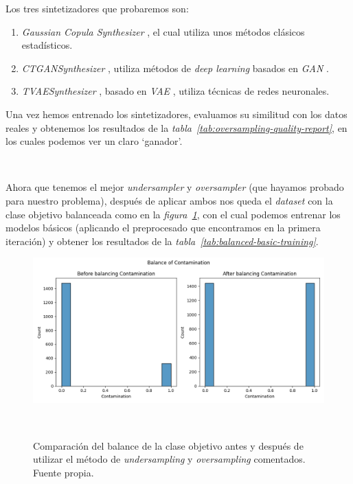 Los tres sintetizadores que probaremos son:

\begin{enumerate}
    \item \textit{Gaussian Copula Synthesizer} \cite{Gaussian4:online}, el cual utiliza unos métodos clásicos estadísticos.
    \item \textit{CTGANSynthesizer} \cite{CTGANSyn50:online}, utiliza métodos de \textit{deep learning} basados en \textit{GAN} \cite{Generati72:online}.
    \item \textit{TVAESynthesizer} \cite{TVAESynt0:online}, basado en \textit{VAE} \cite{Variatio61:online}, utiliza técnicas de redes neuronales.
\end{enumerate}

Una vez hemos entrenado los sintetizadores, evaluamos su similitud con los datos reales y obtenemos los resultados de la \textit{tabla\ \ref{tab:oversampling-quality-report}}, en los cuales podemos ver un claro `ganador'.

\begin{table}[!ht]
    \centering
    \caption{Resultados del \textit{quality report} de los datos generados con los sintetizadores. Fuente propia}\ \label{tab:oversampling-quality-report}
\end{table}

Ahora que tenemos el mejor \textit{undersampler} y \textit{oversampler} (que hayamos probado para nuestro problema), después de aplicar ambos nos queda el \textit{dataset} con la clase objetivo balanceada como en la \textit{figura\ \ref{fig:balance-second-iteration}}, con el cual podemos entrenar los modelos básicos (aplicando el preprocesado que encontramos en la primera iteración) y obtener los resultados de la \textit{tabla\ \ref{tab:balanced-basic-training}}. 

\begin{figure}[!ht]
    \centering
    \includegraphics[width=0.7\linewidth]{media/images/balance.png}
    \caption{Comparación del balance de la clase objetivo antes y después de utilizar el método de \textit{undersampling} y \textit{oversampling} comentados. Fuente propia.}\ \label{fig:balance-second-iteration}
\end{figure}

